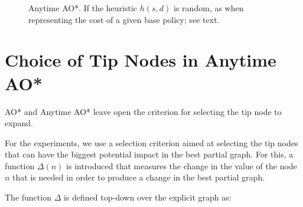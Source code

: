 \documentclass[letterpaper]{article}
\newcommand{\Omit}[1]{}
\begin{document}
\begin{figure}[t]
\centering
{}
\caption{Anytime AO*. If the heuristic $h(s,d)$ is random, as 
when representing the cost of a given base policy; see text.}
\label{fig:anytime-ao*}
\end{figure}


\section{Choice of Tip Nodes in Anytime AO*}

AO* and Anytime AO* leave  open the criterion for selecting
the tip node to expand.
\Omit{
}
For the experiments, we  use a selection  criterion aimed at selecting the tip
nodes that can have the biggest potential impact in the best partial graph.
For this,    a  function $\Delta(n)$ is introduced that measures the change in the  value of the 
node $n$ that is needed in order to produce a change in the  best partial graph.
\Omit{
Nodes that are part 
of the best solution graph have non-negative $\Delta$'s, as their 
$V$ or $Q$ values must increase for then being excluded from the
best solution graph. On the other hand, nodes that are not part
of the best solution graph have non-positive $\Delta$'s, as their
$V$ or $Q$ values must decrease for them becoming part of the 
best solution graph. }
The function $\Delta$ is defined top-down over the explicit graph 
as:
\end{document}
